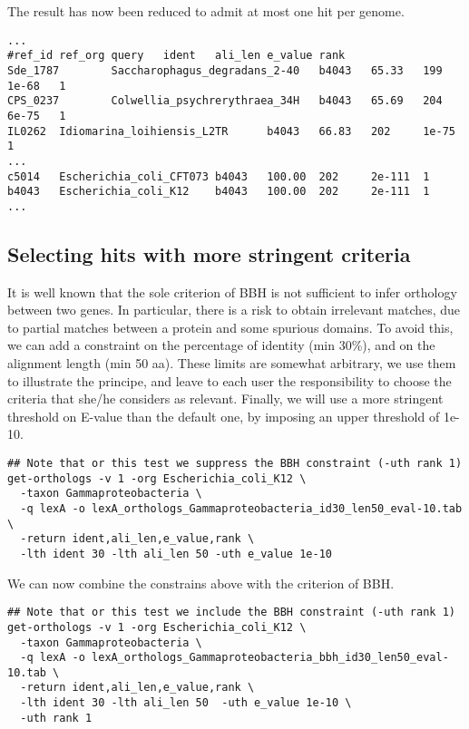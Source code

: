 The result has now been reduced to admit at most one hit per genome.

\begin{scriptsize}
\begin{verbatim}
...
#ref_id ref_org query   ident   ali_len e_value rank
Sde_1787        Saccharophagus_degradans_2-40   b4043   65.33   199     1e-68   1
CPS_0237        Colwellia_psychrerythraea_34H   b4043   65.69   204     6e-75   1
IL0262  Idiomarina_loihiensis_L2TR      b4043   66.83   202     1e-75   1
...
c5014   Escherichia_coli_CFT073 b4043   100.00  202     2e-111  1
b4043   Escherichia_coli_K12    b4043   100.00  202     2e-111  1
...
\end{verbatim}
\end{scriptsize}

\subsection{Selecting hits with more stringent criteria}

It is well known that the sole criterion of BBH is not sufficient to
infer orthology between two genes. In particular, there is a risk to
obtain irrelevant matches, due to partial matches between a protein
and some spurious domains. To avoid this, we can add a constraint on
the percentage of identity (min 30\%), and on the alignment length
(min 50 aa). These limits are somewhat arbitrary, we use them to
illustrate the principe, and leave to each user the responsibility to
choose the criteria that she/he considers as relevant. Finally, we
will use a more stringent threshold on E-value than the default one,
by imposing an upper threshold of 1e-10.

\begin{footnotesize}
\begin{verbatim}
## Note that or this test we suppress the BBH constraint (-uth rank 1)
get-orthologs -v 1 -org Escherichia_coli_K12 \
  -taxon Gammaproteobacteria \
  -q lexA -o lexA_orthologs_Gammaproteobacteria_id30_len50_eval-10.tab \
  -return ident,ali_len,e_value,rank \
  -lth ident 30 -lth ali_len 50 -uth e_value 1e-10
\end{verbatim}
\end{footnotesize}

We can now combine the constrains above with the criterion of BBH.

\begin{footnotesize}
\begin{verbatim}
## Note that or this test we include the BBH constraint (-uth rank 1)
get-orthologs -v 1 -org Escherichia_coli_K12 \
  -taxon Gammaproteobacteria \
  -q lexA -o lexA_orthologs_Gammaproteobacteria_bbh_id30_len50_eval-10.tab \
  -return ident,ali_len,e_value,rank \
  -lth ident 30 -lth ali_len 50  -uth e_value 1e-10 \
  -uth rank 1 
\end{verbatim}
\end{footnotesize}

